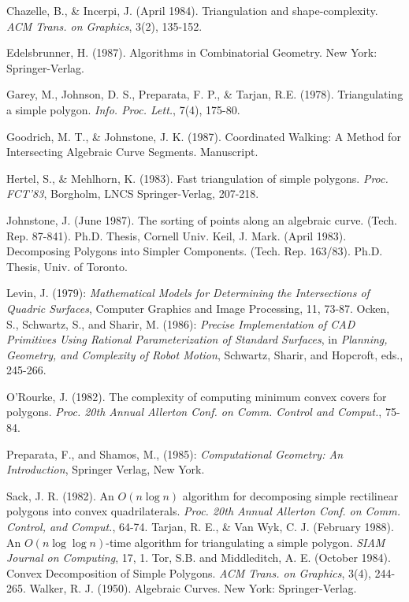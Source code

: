 \begin{thebibliography}{Abhyankar 87b}
 Chazelle, B., \& Incerpi, J. (April 1984).
Triangulation and shape-complexity. 
{\em ACM Trans. on Graphics}, 3(2), 135-152.

 Edelsbrunner, H. (1987).
Algorithms in Combinatorial Geometry.
New York: Springer-Verlag.

 Garey, M., Johnson, D. S., Preparata, 
F. P., \& Tarjan, R.E. (1978).
Triangulating a simple polygon.
{\em Info. Proc. Lett.}, 7(4), 175-80.

 Goodrich, M. T., \& Johnstone, J. K. (1987).
Coordinated Walking: A Method for Intersecting Algebraic Curve Segments.
Manuscript.

 Hertel, S., \& Mehlhorn, K. (1983).
Fast triangulation of simple polygons.
{\em Proc. FCT'83}, Borgholm, LNCS Springer-Verlag, 207-218.


 Johnstone, J. (June 1987).
The sorting of points along an algebraic curve.
(Tech. Rep. 87-841). Ph.D. Thesis, Cornell Univ.
%
 Keil, J. Mark. (April 1983).
Decomposing Polygons into Simpler Components.
(Tech. Rep. 163/83). Ph.D. Thesis, Univ. of Toronto.

 Levin, J. (1979):
{\em Mathematical Models for Determining the Intersections of Quadric Surfaces},
Computer Graphics and Image Processing, 11, 73-87.
%
 Ocken, S., Schwartz, S., and Sharir, M. (1986):
{\em Precise Implementation of CAD Primitives Using Rational Parameterization 
of Standard Surfaces}, in {\em Planning, Geometry, and Complexity of Robot
Motion}, Schwartz, Sharir, and Hopcroft, eds., 245-266.

 O'Rourke, J. (1982).
The complexity of computing minimum convex covers for polygons.
{\em Proc. 20th Annual Allerton Conf. on Comm. Control and Comput.}, 75-84.

 Preparata, F., and Shamos, M., (1985):
{\em Computational Geometry: An Introduction},
Springer Verlag, New York.

 Sack, J. R. (1982).
An $O(n \log n)$ algorithm for decomposing simple rectilinear polygons
into convex quadrilaterals.
{\em Proc. 20th Annual Allerton Conf. on Comm. Control, and Comput.},
64-74.
%
 Tarjan, R. E., \& Van Wyk, C. J. (February 1988).
An $O(n \log \log n)$-time algorithm for triangulating a simple polygon.
{\em SIAM Journal on Computing}, 17, 1.
%
 Tor, S.B. and Middleditch, A. E. (October 1984).
Convex Decomposition of Simple Polygons.
{\em ACM Trans. on Graphics}, 3(4), 244-265.
%
 Walker, R. J. (1950).
Algebraic Curves.
New York: Springer-Verlag.
\end{thebibliography}
